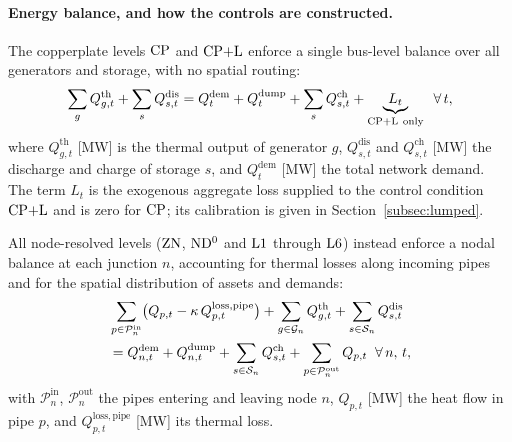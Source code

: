 \paragraph{Energy balance, and how the controls are constructed.}
The copperplate levels $\mathrm{CP}$ and $\mathrm{CP{+}L}$ enforce a single bus-level balance over all
generators and storage, with no spatial routing:
%
\begin{equation}
  \sum_{g} Q_{g,t}^{\mathrm{th}}
    + \sum_{s} Q_{s,t}^{\mathrm{dis}}
  = Q_t^{\mathrm{dem}} + Q_t^{\mathrm{dump}}
    + \sum_{s} Q_{s,t}^{\mathrm{ch}}
  + \underbrace{L_t}_{\mathrm{CP{+}L}\ \mathrm{only}}
  \;\; \forall\, t,
  \label{eq:balance_cp}
\end{equation}
%
where $Q_{g,t}^{\mathrm{th}}$ [MW] is the thermal output of generator $g$,
$Q_{s,t}^{\mathrm{dis}}$ and $Q_{s,t}^{\mathrm{ch}}$ [MW] the discharge and charge of
storage $s$, and $Q_t^{\mathrm{dem}}$ [MW] the total network demand. The term $L_t$ is
the exogenous aggregate loss supplied to the control condition $\mathrm{CP{+}L}$ and is zero for
$\mathrm{CP}$; its calibration is given in Section~\ref{subsec:lumped}.

All node-resolved levels ($\mathrm{ZN}$, $\mathrm{ND^{0}}$ and $\mathrm{L1}$ through $\mathrm{L6}$) instead enforce
a nodal balance at each junction $n$, accounting for thermal losses along incoming pipes
and for the spatial distribution of assets and demands:
%
\begin{align}
  &\sum_{p \in \mathcal{P}_n^{\mathrm{in}}}
    \bigl(Q_{p,t} - \kappa\, Q_{p,t}^{\mathrm{loss,pipe}}\bigr)
  + \sum_{g \in \mathcal{G}_n} Q_{g,t}^{\mathrm{th}}
  + \sum_{s \in \mathcal{S}_n} Q_{s,t}^{\mathrm{dis}} \notag \\
  &= Q_{n,t}^{\mathrm{dem}} + Q_{n,t}^{\mathrm{dump}}
  + \sum_{s \in \mathcal{S}_n} Q_{s,t}^{\mathrm{ch}}
  + \sum_{p \in \mathcal{P}_n^{\mathrm{out}}} Q_{p,t}
  \;\; \forall\, n,\, t,
  \label{eq:balance_nodal}
\end{align}
%
with $\mathcal{P}_n^{\mathrm{in}}$, $\mathcal{P}_n^{\mathrm{out}}$ the pipes entering and
leaving node $n$, $Q_{p,t}$ [MW] the heat flow in pipe $p$, and
$Q_{p,t}^{\mathrm{loss,pipe}}$ [MW] its thermal loss.

